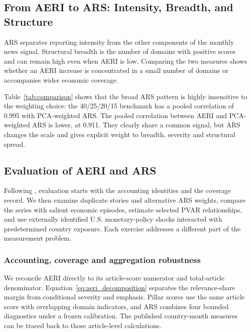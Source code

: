 \documentclass[12pt]{article}
\begin{document}
\subsection{From AERI to ARS: Intensity, Breadth, and Structure}\label{sec:aeri_vs_ars}
ARS separates reporting intensity from the other components of the monthly news signal. Structural breadth is the number of domains with positive scores and can remain high even when AERI is low. Comparing the two measures shows whether an AERI increase is concentrated in a small number of domains or accompanies wider economic coverage.

Table~\ref{tab:comparison} shows that the broad ARS pattern is highly insensitive to the weighting choice: the 40/25/20/15 benchmark has a pooled correlation of 0.995 with PCA-weighted ARS. The pooled correlation between AERI and PCA-weighted ARS is lower, at 0.911. They clearly share a common signal, but ARS changes the scale and gives explicit weight to breadth, severity and structural spread.

\subsection{Evaluation of AERI and ARS}\label{sec:validation}
Following \citet{baker2016}, evaluation starts with the accounting identities and the coverage record. We then examine duplicate stories and alternative ARS weights, compare the series with salient economic episodes, estimate selected PVAR relationships, and use externally identified U.S. monetary-policy shocks interacted with predetermined country exposure. Each exercise addresses a different part of the measurement problem.

\subsubsection{Accounting, coverage and aggregation robustness}
We reconcile AERI directly to its article-score numerator and total-article denominator. Equation~\eqref{eq:aeri_decomposition} separates the relevance-share margin from conditional severity and emphasis. Pillar scores use the same article score with overlapping domain indicators, and ARS combines four bounded diagnostics under a frozen calibration. The published country-month measures can be traced back to those article-level calculations.
\end{document}
